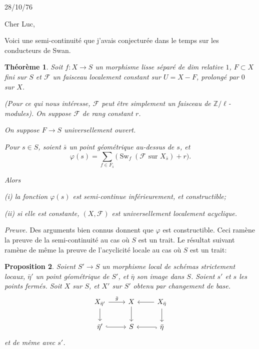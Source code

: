 \documentclass[11pt,a4paper]{article}
\theoremstyle{plain}
\newtheorem{theorem}{Th\'eor\`eme}
\newtheorem{proposition}[theorem]{Proposition}
\theoremstyle{definition}
\DeclareMathOperator{\Sw}{Sw}
\begin{document}

\begin{flushright}
28/10/76
\end{flushright}

\noindent Cher Luc,

\medskip

Voici une semi-continuit\'e que j'avais conjectur\'ee dans le temps sur les conducteurs de Swan.

\begin{theorem}
Soit $f: X \to S$ un morphisme lisse s\'epar\'e de dim relative $1$, $F \subset X$ fini sur $S$ et $\mathcal{F}$ un faisceau localement constant sur $U = X - F$, prolong\'e par $0$ sur $X$.

\medskip
(Pour ce qui nous int\'eresse, $\mathcal{F}$ peut \^etre simplement un faisceau de $\mathbb{Z}/\ell$-modules). On suppose $\mathcal{F}$ de rang constant $r$.

\medskip
On suppose $F \to S$ universellement ouvert.

\medskip
Pour $s \in S$, soient $\bar{s}$ un point g\'eom\'etrique au-dessus de $s$, et
\[
\varphi(s) = \sum_{f \in F_{\bar{s}}} \bigl(\Sw_f(\mathcal{F} \text{ sur } X_{\bar{s}}) + r\bigr).
\]

\medskip
Alors

\textup{(i)} la fonction $\varphi(s)$ est semi-continue inf\'erieurement, et constructible;

\textup{(ii)} si elle est constante, $(X, \mathcal{F})$ est universellement localement acyclique.
\end{theorem}

\medskip

\noindent \textit{Preuve.} Des arguments bien connus donnent que $\varphi$ est constructible. Ceci ram\`ene la preuve de la semi-continuit\'e au cas o\`u $S$ est un trait. Le r\'esultat suivant ram\`ene de m\^eme la preuve de l'acyclicit\'e locale au cas o\`u $S$ est un trait:

\begin{proposition}
Soient $S' \to S$ un morphisme local de sch\'emas strictement locaux, $\bar{\eta}'$ un point g\'eom\'etrique de $S'$, et $\bar{\eta}$ son image dans $S$. Soient $s'$ et $s$ les points ferm\'es. Soit $X$ sur $S$, et $X'$ sur $S'$ obtenu par changement de base.
\[
\begin{tikzcd}
X_{\bar{\eta}'} \arrow[r, "\bar{g}"] \arrow[d] & X \arrow[d] & X_{\bar{\eta}} \arrow[l] \arrow[d] \\
\bar{\eta}' \arrow[r, hook] & S & \bar{\eta} \arrow[l, hook]
\end{tikzcd}
\]
et de m\^eme avec $s'$.
\end{proposition}
\end{document}
